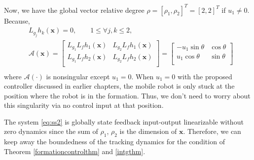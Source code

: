 \documentclass[11pt, a4paper, oneside, openany, reqno]{book}
\theoremstyle{definition}
\theoremstyle{remark}
\numberwithin{equation}{chapter} %
\newcommand{\A}{\mathcal{A}}
\newcommand{\x}{\textbf{x}}
\begin{document}
Now, we have the global vector relative degree 
$ \rho=\left[ \rho_1, \rho_2  \right]^T=\left[2,2  \right]^T $ if $ u_1 \neq 0 $.
Because,
\begin{equation}\begin{split}
	& L_{g_j} h_k (\x) = 0, \qquad 1 \leq \forall j,k \leq 2,\\
	& \A (\x)=\left[ \begin{array}{cc } 
		L_{g_1} L_f h_1 (\x) & L_{g_2} L_f h_1 (\x) \\
		L_{g_1} L_f h_2 (\x) & L_{g_2} L_f h_2 (\x) \\
	\end{array} \right] 
	=\left[ \begin{array}{cc } -u_1 \sin \theta & \cos \theta \\
		u_1 \cos \theta & \sin \theta \\ 
		\end{array} \right] \\	
\end{split}\end{equation}
where $ \A (\cdot) $ is nonsingular except $ u_1 = 0 $. 
When $ u_1 = 0 $ with the proposed controller discussed in earlier chapters, 
the mobile robot is only stuck at the position where the robot is in the formation. 
Thus, we don't need to worry about this singularity via no control input at that position.

The system \eqref{eq:ss2} is globally state feedback input-output linearizable without zero dynamics
since the sum of $ \rho_1 $, $ \rho_2 $ is the dimension of $ \x $. 
Therefore, we can keep away the boundedness of the tracking dynamics
for the condition of Theorem \ref{formationcontrolthm} and \ref{intgthm}.
\end{document}

